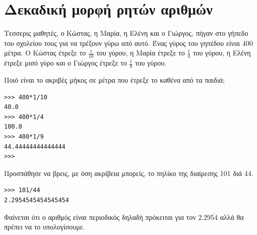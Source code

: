 \section{Δεκαδική μορφή ρητών αριθμών}
\begin{exercise}
Τεσσερις μαθητές, ο Κώστας, η Μαρία, η Ελένη και ο Γιώργος, πήγαν στο γήπεδο του σχολείου τους για να τρέξουν γύρω από αυτό. Ένας γύρος του γηπέδου είναι 400 μέτρα. Ο Κώστας έτρεξε το $\frac{1}{10}$ του  γύρου,  η  Μαρία  έτρεξε  το $\frac{1}{4}$ του γύρου, η Ελένη έτρεξε μισό γύρο και ο Γιώργος έτρεξε το $\frac{1}{9}$ του γύρου.

Ποιό είναι το ακριβές μήκος σε μέτρα που έτρεξε το καθένα από τα παιδιά;
\end{exercise}
\begin{lstlisting}
>>> 400*1/10
40.0
>>> 400*1/4
100.0
>>> 400*1/9
44.44444444444444
>>>
\end{lstlisting}
\begin{exercise}
Προσπάθησε να βρεις, με όση ακρίβεια μπορείς, το πηλίκο της διαίρεσης 101 διά 44.
\end{exercise}
\begin{lstlisting}
>>> 101/44
2.2954545454545454
\end{lstlisting}
Φαίνεται ότι ο αριθμός είναι περιοδικός δηλαδή πρόκειται για τον $2.29\overline{54}$ αλλά θα πρέπει να το υπολογίσουμε.

